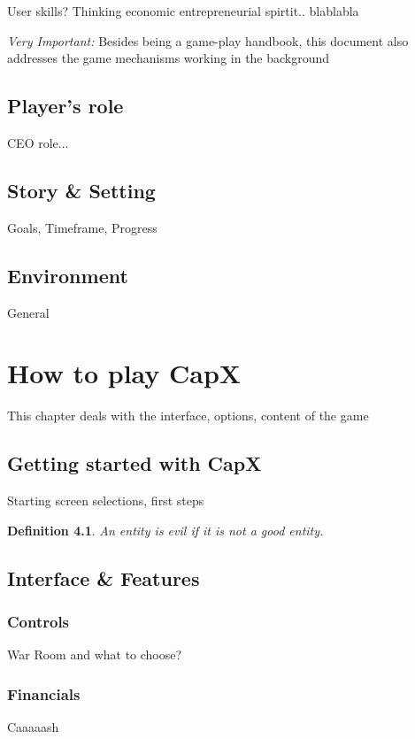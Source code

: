 \documentclass[11pt,titlepage,oneside,openany]{book}
\newtheorem{definition}{Definition}
\begin{document}
User skills? Thinking economic entrepreneurial spirtit.. blablabla

\emph{Very Important:} Besides being a game-play handbook, this document also addresses the game mechanisms working in the background
 
\section{Player's role}
 
CEO role... 

\section{Story \& Setting}

Goals, Timeframe, Progress

\section{Environment}

General 

\chapter{How to play CapX}
\label{cha:theory}
 This chapter deals with the interface, options, content of the game




\section{Getting started with CapX}
\label{sec:prelim}
Starting screen selections, first steps
\begin{definition}
\label{def:evil}
An entity is evil if it is not a good entity.
\end{definition}

\section{Interface \& Features}
\label{sec:good}

\subsection{Controls}

War Room and what to choose?
\subsection{Financials}
Caaaaash
\end{document}

